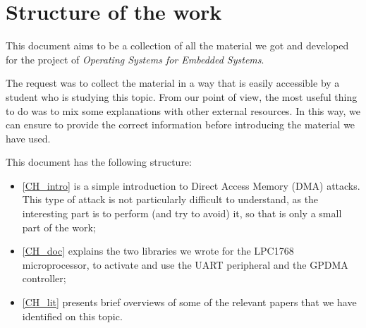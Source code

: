 \chapter{Structure of the work} \label{CH_struct}

This document aims to be a collection of all the material we got and developed for the project of \textit{Operating Systems for Embedded Systems}. 

The request was to collect the material in a way that is easily accessible by a student who is studying this topic. From our point of view, the most useful thing to do was to mix some explanations with other external resources. In this way, we can ensure to provide the correct information before introducing the material we have used. 

This document has the following structure:
\begin{itemize}
    \item \autoref{CH_intro} is a simple introduction to Direct Access Memory (DMA) attacks. This type of attack is not particularly difficult to understand, as the interesting part is to perform (and try to avoid) it, so that is only a small part of the work;
    \item \autoref{CH_doc} explains the two libraries we wrote for the LPC1768 microprocessor, to activate and use the UART peripheral and the GPDMA controller;
    \item \autoref{CH_lit} presents brief overviews of some of the relevant papers that we have identified on this topic.
\end{itemize}

\doclicenseThis